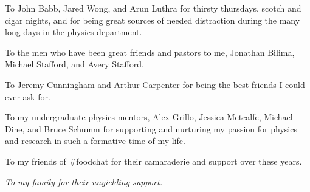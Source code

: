 \documentclass[oneside,final, letterpaper]{ucr}
\begin{document}
\begin{frontmatter}
\begin{acknowledgements}
To John Babb, Jared Wong, and Arun Luthra for thirsty thursdays, scotch and cigar nights, and for being great sources of needed distraction during the many long days in the physics department.

To the men who have been great friends and pastors to me, Jonathan Bilima, Michael Stafford, and Avery Stafford.

To Jeremy Cunningham and Arthur Carpenter for being the best friends I could ever ask for.

To my undergraduate physics mentors, Alex Grillo, Jessica Metcalfe, Michael Dine, and Bruce Schumm for supporting and nurturing my passion for physics and research in such a formative time of my life. 

To my friends of \#foodchat for their camaraderie and support over these years. 
\end{acknowledgements}

\begin{dedication}
\null\vfil
{\large
\begin{center}
\textit{To my family for their unyielding support.}
\end{center}}
\vfil\null
\end{dedication}



\tableofcontents
\listoffigures
\listoftables
\end{frontmatter}

\dsp















\nocite{*}
%
\ssp
 
 
\end{document}
